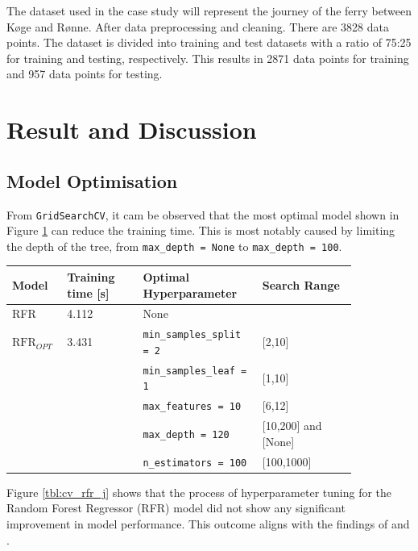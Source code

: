 \documentclass[]{interact}
\theoremstyle{plain}%
\theoremstyle{definition}
\theoremstyle{remark}
\begin{document}
The dataset used in the case study will represent the journey of the ferry between K{\o}ge and R{\o}nne. After data preprocessing and cleaning. There are 3828 data points. The dataset is divided into training and test datasets with a ratio of 75:25 for training and testing, respectively. This results in 2871 data points for training and 957 data points for testing.

\section{Result and Discussion}\label{sec:research_discussion_j}

\subsection{Model Optimisation}\label{sec:hpo_journal}

From \texttt{GridSearchCV}, it cam be observed that the most optimal model shown in Figure \ref{tbl:hpo_optimal} can reduce the training time. This is most notably caused by limiting the depth of the tree, from \texttt{max\_depth = None} to \texttt{max\_depth = 100}.  

\begin{table}
  {\begin{tabular}{ p{0.1\linewidth} p{0.2\linewidth}  p{0.3\linewidth} p{0.25\linewidth}}
  \hline
  Model & Training time [s] &  Optimal Hyperparameter & Search Range \\
  \hline
  RFR & 4.112 & None \\
  $\text{RFR}_{OPT}$ & 3.431  & {\tt min\_samples\_split = 2} & [2,10]\\
  &&{\tt min\_samples\_leaf = 1} & [1,10]\\
  &&{\tt max\_features = 10} & [6,12]\\
  &&{\tt max\_depth = 120} & [10,200] and [None]\\
  &&{\tt n\_estimators = 100} & [100,1000]\\
  \hline
  \end{tabular}}
\label{tbl:hpo_optimal}
\end{table}

Figure \ref{tbl:cv_rfr_j} shows that the process of hyperparameter tuning for the Random Forest Regressor (RFR) model did not show any significant improvement in model performance. This outcome aligns with the findings of \citet{Kuhn.2013} and \citet{Hastie.2009}.
\end{document}
